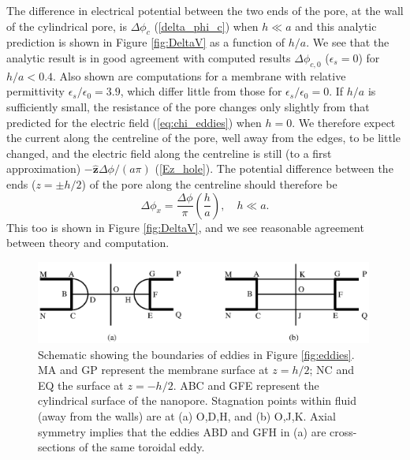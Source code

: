 The difference in
electrical potential between the two ends of the
pore, at the wall of the cylindrical pore, is
$\Delta\phi_c$ (\ref{delta_phi_c}) when $h\ll a$
and this analytic prediction is shown
in Figure \ref{fig:DeltaV}
as a function of $h/a$. We see that the analytic result is in good 
agreement with computed results $\Delta\phi_{c,0}$ ($\epsilon_s=0$)
for $h/a<0.4$.
Also shown are computations for a membrane with relative permittivity
$\epsilon_s/\epsilon_0=3.9$, which differ little from those for
$\epsilon_s/\epsilon_0=0$.
If $h/a$ is sufficiently small, the resistance
of the pore changes only slightly \cite{sherwood2014} from that predicted for
the electric field (\ref{eq:chi_eddies})
when $h=0$.  We therefore expect the current along the
centreline of the pore, well away from the edges,
to be little changed, and the electric field
along the centreline is  still (to a first approximation)
$-\hat{\mathbf{z}}\Delta\phi/(a\pi)$
(\ref{Ez_hole}). The potential difference
between the ends ($z=\pm h/2$) of the pore along the centreline
should therefore be
\begin{equation}
\Delta\phi_x=\frac{\Delta\phi}{\pi}\left(\frac{h}{a}\right),\quad h\ll a.
\label{delta_phi_x}
\end{equation}
This too is shown in Figure \ref{fig:DeltaV}, and we see reasonable agreement
between theory and computation.

\begin{figure}[h]
\centering
\includegraphics[width=0.99\textwidth,clip=true]{eddies/eddy_fig5.eps}
\caption{Schematic showing the boundaries of eddies in Figure \ref{fig:eddies}.
MA and GP represent the membrane surface at $z=h/2$; NC and EQ
the surface at $z=-h/2$. ABC and GFE represent the cylindrical surface of the
nanopore. Stagnation points within fluid (away from the walls)
are at (a) O,D,H, and (b) O,J,K. Axial symmetry implies that
the eddies ABD and GFH in (a) are cross-sections of the same toroidal eddy.
\label{fig:eddy_schematic}}
\end{figure}


